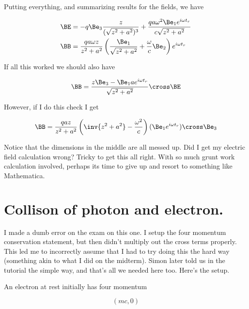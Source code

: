 Putting everything, and summarizing results for the fields, we have

\begin{align}\label{eqn:relativisticElectrodynamicsExamReflection:n}
\BE &= 
-q \Be_3 \frac{z}{(\sqrt{z^2 + a^2})^3}
+
\frac{q a \omega^2 \Be_1 e^{i \omega t_r} }{c \sqrt{z^2 + a^2}} \\
\BB 
&= \frac{q a \omega z}{ z^2 + a^2} \left( \frac{\Be_1}{\sqrt{z^2 + a^2}} + \frac{\omega}{c} \Be_2 \right) e^{i \omega t_r}
\end{align}

If all this worked we should also have

\begin{equation}\label{eqn:relativisticElectrodynamicsExamReflection:n}
\BB = \frac{z \Be_3 - \Be_1 a e^{i \omega t_r}}{\sqrt{z^2 + a^2}} \cross \BE
\end{equation}

However, if I do this check I get

\begin{equation}\label{eqn:relativisticElectrodynamicsExamReflection:n}
\BB = \frac{q a z}{z^2 + a^2} \left( \inv{z^2 + a^2} - \frac{\omega^2 }{c} \right) (\Be_1 e^{i \omega t_r}) \cross \Be_3
\end{equation}

Notice that the dimensions in the middle are all messed up.  Did I get my electric field calculation wrong?  Tricky to get this all right.  With so much grunt work calculation involved, perhaps its time to give up and resort to something like Mathematica.

\section{Collison of photon and electron.}

I made a dumb error on the exam on this one.  I setup the four momentum conservation statement, but then didn't multiply out the cross terms properly.  This led me to incorrectly assume that I had to try doing this the hard way (something akin to what I did on the midterm).  Simon later told us in the tutorial the simple way, and that's all we needed here too.  Here's the setup.

An electron at rest initially has four momentum

\begin{equation}\label{eqn:relativisticElectrodynamicsExamReflection:n}
(m c, 0)
\end{equation}

